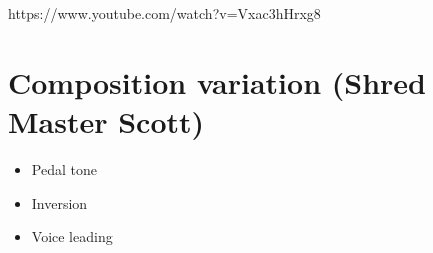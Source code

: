 \documentclass{article}
\begin{document}
https://www.youtube.com/watch?v=Vxac3hHrxg8

\newpage
\section{Composition variation (Shred Master Scott)}

\begin{itemize}
	\item Pedal tone
	\item Inversion
	\item Voice leading
\end{itemize}

\newpage
\nocite{Lizzio2023}


\end{document}
